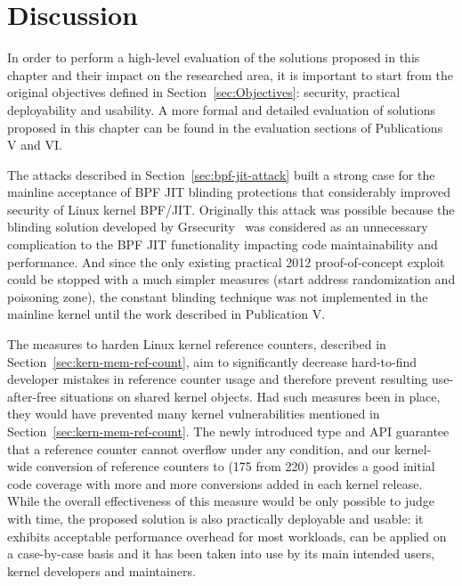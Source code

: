 \section{Discussion}

In order to perform a high-level evaluation of the solutions proposed in this chapter and their impact on the researched area, it is important to start from the original objectives defined in Section~\ref{sec:Objectives}: security, practical deployability and usability. A more formal and detailed evaluation of solutions proposed in this chapter can be found in the evaluation sections of Publications V and VI. 

The attacks described in Section~\ref{sec:bpf-jit-attack} built a strong case for the mainline acceptance of BPF JIT blinding protections that considerably improved security of Linux kernel BPF/JIT. Originally this attack was possible because the blinding solution developed by Grsecurity~\cite{grsecurity} was considered as an unnecessary complication to the BPF JIT functionality impacting code maintainability and performance. And since the only existing practical 2012 proof-of-concept exploit~\cite{mcallister2012attacking} could be stopped with a much simpler measures (start address randomization and poisoning zone), the constant blinding technique was not implemented in the mainline kernel until the work described in Publication V. 

The measures to harden Linux kernel reference counters, described in Section~\ref{sec:kern-mem-ref-count}, aim to significantly decrease hard-to-find developer mistakes in reference counter usage and therefore prevent resulting use-after-free situations on shared kernel objects. Had such measures been in place, they would have prevented many kernel vulnerabilities mentioned in Section~\ref{sec:kern-mem-ref-count}. The newly introduced  type and API guarantee that a reference counter cannot overflow under any condition, and our kernel-wide conversion of reference counters to  (175 from 220) provides a good initial code coverage with more and more conversions added in each kernel release. While the overall effectiveness of this measure would be only possible to judge with time, the proposed solution is also practically deployable and usable: it exhibits acceptable performance overhead for most workloads, can be applied on a case-by-case basis and it has been taken into use by its main intended users, kernel developers and maintainers. 

